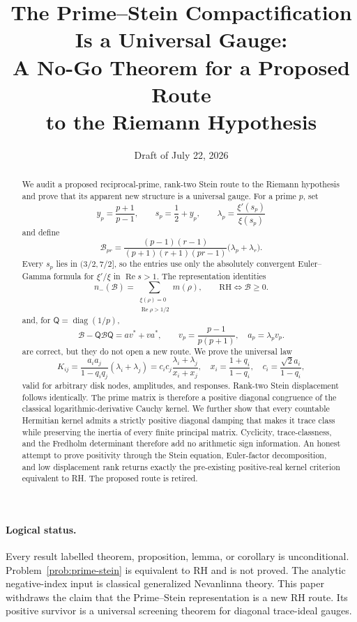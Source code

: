 \documentclass[11pt]{article}
\title{The Prime--Stein Compactification Is a Universal Gauge:\\
A No-Go Theorem for a Proposed Route\\
to the Riemann Hypothesis}
\author{}
\date{Draft of July 22, 2026}
\theoremstyle{definition}
\theoremstyle{remark}
\newcommand{\cB}{\mathcal B}
\newcommand{\diag}{\operatorname{diag}}
\newcommand{\nm}{n_{-}}
\newcommand{\Rea}{\operatorname{Re}}
\begin{document}
\maketitle

\begin{abstract}
We audit a proposed reciprocal-prime, rank-two Stein route to the Riemann hypothesis and prove
that its apparent new structure is a universal gauge.  For a prime $p$, set
\[
 y_p=\frac{p+1}{p-1},\qquad
 s_p=\frac12+y_p,\qquad
 \lambda_p=\frac{\xi'(s_p)}{\xi(s_p)}
\]
and define
\[
 \cB_{pr}
 =\frac{(p-1)(r-1)}{(p+1)(r+1)(pr-1)}
   \bigl(\lambda_p+\lambda_r\bigr).
\]
Every $s_p$ lies in $(3/2,7/2]$, so the entries use only the absolutely convergent
Euler--Gamma formula for $\xi'/\xi$ in $\Rea s>1$.  The representation identities
\[
 \nm(\cB)
 =\sum_{\substack{\xi(\rho)=0\\ \Rea\rho>1/2}}m(\rho),
 \qquad
 \mathrm{RH}\Longleftrightarrow \cB\geq0.
\]
and, for $\mathsf Q=\diag(1/p)$,
\[
 \cB-\mathsf Q\cB\mathsf Q=av^*+va^*,
\qquad
 v_p=\frac{p-1}{p(p+1)},\quad a_p=\lambda_pv_p.
\]
are correct, but they do not open a new route.  We prove the universal law
\[
 K_{ij}=\frac{a_i a_j}{1-q_iq_j}(\lambda_i+\lambda_j)
 =c_i c_j\frac{\lambda_i+\lambda_j}{x_i+x_j},
 \quad
 x_i=\frac{1+q_i}{1-q_i},\quad
 c_i=\frac{\sqrt2a_i}{1-q_i},
\]
valid for arbitrary disk nodes, amplitudes, and responses.  Rank-two Stein displacement follows
identically.  The prime matrix is therefore a positive diagonal congruence of the classical
logarithmic-derivative Cauchy kernel.  We further show that every countable Hermitian kernel admits
a strictly positive diagonal damping that makes it trace class while preserving the inertia of
every finite principal matrix.  Cyclicity, trace-classness, and the Fredholm determinant therefore
add no arithmetic sign information.  An honest attempt to prove positivity through the Stein
equation, Euler-factor decomposition, and low displacement rank returns exactly the pre-existing
positive-real kernel criterion equivalent to RH.  The proposed route is retired.
\end{abstract}

\paragraph{Logical status.}
Every result labelled theorem, proposition, lemma, or corollary is unconditional.
Problem~\ref{prob:prime-stein} is equivalent to RH and is not proved.  The analytic
negative-index input is classical generalized Nevanlinna theory.  This paper withdraws the claim
that the Prime--Stein representation is a new RH route.  Its positive survivor is a universal
screening theorem for diagonal trace-ideal gauges.
\end{document}
